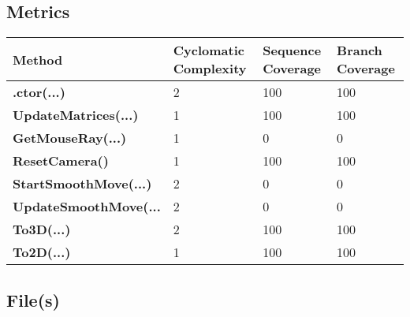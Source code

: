 \documentclass[a4paper,10pt]{article}
\begin{document}
\subsection{Metrics}
\begin{longtable}[l]{|l|l|l|l|}
\hline
\textbf{Method} & \textbf{Cyclomatic Complexity} & \textbf{Sequence Coverage} & \textbf{Branch Coverage}\\
\hline
\textbf{.ctor(...)} & 2 & 100 & 100\\
\hline
\textbf{UpdateMatrices(...)} & 1 & 100 & 100\\
\hline
\textbf{GetMouseRay(...)} & 1 & 0 & 0\\
\hline
\textbf{ResetCamera()} & 1 & 100 & 100\\
\hline
\textbf{StartSmoothMove(...)} & 2 & 0 & 0\\
\hline
\textbf{UpdateSmoothMove(...} & 2 & 0 & 0\\
\hline
\textbf{To3D(...)} & 2 & 100 & 100\\
\hline
\textbf{To2D(...)} & 1 & 100 & 100\\
\hline
\end{longtable}
\subsection{File(s)}
\end{document}
